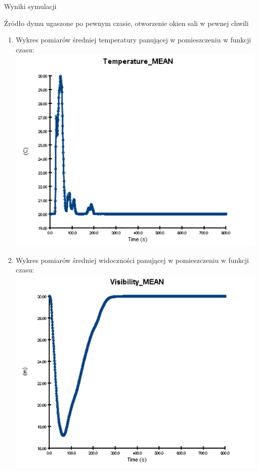 \documentclass[a4paper, 12pt]{scrartcl}
\begin{document}
\begin{section}{Wyniki symulacji}
		\begin{subsection}{Źródło dymu ugaszone po pewnym czasie, otworzenie okien sali w pewnej chwili}
			\begin{enumerate}[i]
				\item Wykres pomiarów średniej temperatury panującej w pomieszczeniu w funkcji czasu: \\
				\includegraphics{../H24_Windows/temp} \newpage
				\item Wykres pomiarów średniej widoczności panującej w pomieszczeniu w funkcji czasu:
				\includegraphics{../H24_Windows/visibility}
			\end{enumerate}
		\end{subsection}
		

\end{section}
\end{document}
